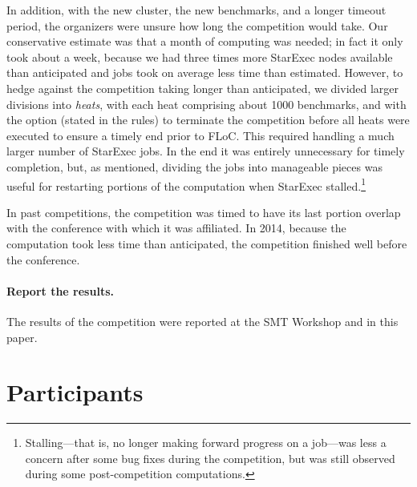 \documentclass[twoside,11pt]{article}
\begin{document}
In addition, with the new cluster, the new benchmarks, and a longer timeout period, the organizers were unsure how long the competition would take. Our conservative estimate was that a month of computing was needed; in fact it only took about a week, because we had three times more StarExec nodes available than anticipated and jobs took on average less time than estimated. However, to hedge against the competition taking longer than anticipated, we divided larger divisions into \emph{heats}, with each heat comprising about 1000 benchmarks, and with the option (stated in the rules) to terminate the competition before all heats were executed to ensure a timely end prior to FLoC. This required handling a much larger number of StarExec jobs. In the end it was entirely unnecessary for timely completion, but, as mentioned, dividing the jobs into manageable pieces was useful for restarting portions of the computation when StarExec stalled.\footnote{Stalling---that is, no longer making forward progress on a job---was less a concern after some bug fixes during the competition, but was still observed during some post-competition computations.}

In past competitions, the competition was timed to have its last portion overlap with the conference with which it was affiliated. In 2014, because the computation took less time than anticipated, the competition finished well before the conference.

\paragraph{Report the results.} The results of the competition were reported at the SMT Workshop and in this paper.

\section{Participants}
\label{sec:participants}
\end{document}
